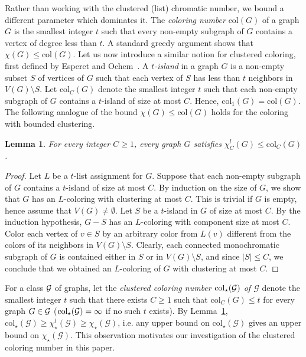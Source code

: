 \documentclass[12pt]{article}
\newcommand{\GG}{{\cal G}}
\newtheorem{lemma}[theorem]{Lemma}
\newcommand{\col}{\text{col}}
\newcommand{\mc}[1]{\mathcal{#1}}
\begin{document}
Rather than working with the clustered (list) chromatic number, we bound a different parameter which dominates it.
The \emph{coloring number} $\col(G)$ of a graph $G$ is the smallest integer $t$ such that every non-empty subgraph of $G$ contains a vertex of degree less than $t$.
A standard greedy argument shows that $\chi(G)\le \col(G)$.  Let us now introduce a similar notion for clustered coloring, first defined by Esperet and Ochem~\cite{EspOch16}. 
A \emph{$t$-island} in a graph $G$ is a non-empty subset $S$ of vertices of $G$ such that each vertex of $S$ has less than $t$ neighbors in $V(G)\setminus S$.
Let $\col_C(G)$ denote the smallest integer $t$ such that each non-empty subgraph of $G$ contains a $t$-island of size at most $C$.
Hence, $\col_1(G)=\col(G)$.  The following analogue of the bound $\chi(G)\le \col(G)$  holds for the coloring with bounded clustering.

\begin{lemma}\label{lemma-coloring}
For every integer $C\ge 1$, every graph $G$ satisfies $\chi^l_C(G)\le \col_C(G)$.
\end{lemma}
\begin{proof} Let $L$ be a $t$-list assignment for $G$.
Suppose that each non-empty subgraph of $G$ contains a $t$-island of size at most $C$.  By induction on the size of $G$, we show that $G$ has an
$L$-coloring with clustering at most $C$.  This is trivial if $G$ is empty, hence assume that $V(G)\neq\emptyset$. Let $S$ be a $t$-island in $G$ of size at most $C$.
By the induction hypothesis, $G - S$ has an $L$-coloring with component size at most $C$.  Color each vertex of $v \in S$ by an arbitrary color from $L(v)$ different from
the colors of its neighbors in $V(G)\setminus S$.  Clearly, each connected monochromatic subgraph of $G$ is contained either in $S$ or in $V(G)\setminus S$, and since $|S|\le C$,
we conclude that we obtained an $L$-coloring of $G$ with clustering at most $C$.
\end{proof}

For a class $\GG$ of graphs, let the \emph{clustered coloring number $\col_\star(\GG)$ of $\mc{G}$} denote the smallest integer $t$ such that there exists $C\ge 1$ such that
$\col_C(G)\le t$ for every graph $G\in\GG$ ($\col_\star(\GG)=\infty$ if no such $t$ exists). By Lemma~\ref{lemma-coloring}, $\col_\star(\mc{G})  \geq \chi^l_\star(\mc{G}) \geq \chi_\star(\mc{G})$, i.e. any upper bound on $\col_\star(\mc{G})$ gives an upper bound on $\chi_\star(\mc{G})$. This observation motivates our investigation of the clustered coloring number in this paper. 
\end{document}
